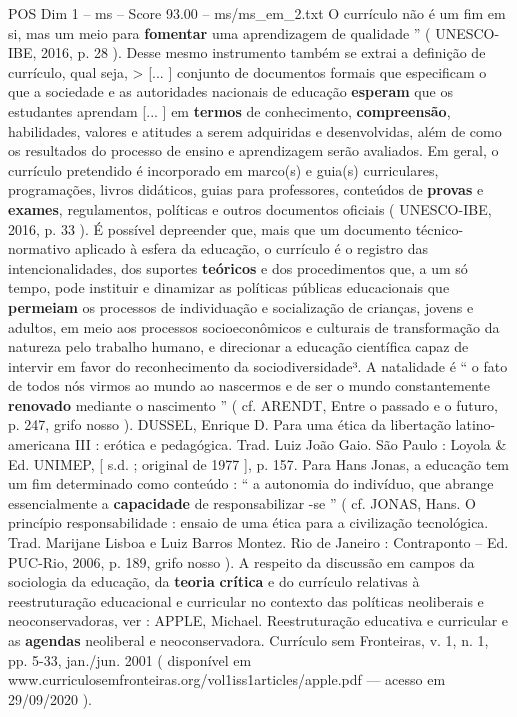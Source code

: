 \begin{textsample}{POS Dim 1 – ms – Score 93.00 – ms/ms\_em\_2.txt}
O currículo não é um fim em si, mas um meio para \textbf{fomentar} uma aprendizagem de qualidade ” ( UNESCO-IBE, 2016, p. 28 ).
Desse mesmo instrumento também se extrai a definição de currículo, qual seja, > [... ] conjunto de documentos formais que especificam o que a sociedade e as autoridades nacionais de educação \textbf{esperam} que os estudantes aprendam [... ] em \textbf{termos} de conhecimento, \textbf{compreensão}, habilidades, valores e atitudes a serem adquiridas e desenvolvidas, além de como os resultados do processo de ensino e aprendizagem serão avaliados.
Em geral, o currículo pretendido é incorporado em marco(s) e guia(s) curriculares, programações, livros didáticos, guias para professores, conteúdos de \textbf{provas} e \textbf{exames}, regulamentos, políticas e outros documentos oficiais ( UNESCO-IBE, 2016, p. 33 ).
É possível depreender que, mais que um documento técnico-normativo aplicado à esfera da educação, o currículo é o registro das intencionalidades, dos suportes \textbf{teóricos} e dos procedimentos que, a um só tempo, pode instituir e dinamizar as políticas públicas educacionais que \textbf{permeiam} os processos de individuação e socialização de crianças, jovens e adultos, em meio aos processos socioeconômicos e culturais de transformação da natureza pelo trabalho humano, e direcionar a educação científica capaz de intervir em favor do reconhecimento da sociodiversidade³.
A natalidade é “ o fato de todos nós virmos ao mundo ao nascermos e de ser o mundo constantemente \textbf{renovado} mediante o nascimento ” ( cf.
ARENDT, Entre o passado e o futuro, p. 247, grifo nosso ).
DUSSEL, Enrique D.
Para uma ética da libertação latino-americana III : erótica e pedagógica.
Trad.
Luiz João Gaio.
São Paulo : Loyola \& Ed.
UNIMEP, [ s.d. ; original de 1977 ], p. 157.
Para Hans Jonas, a educação tem um fim determinado como conteúdo : “ a autonomia do indivíduo, que abrange essencialmente a \textbf{capacidade} de responsabilizar -se ” ( cf.
JONAS, Hans.
O princípio responsabilidade : ensaio de uma ética para a civilização tecnológica.
Trad.
Marijane Lisboa e Luiz Barros Montez.
Rio de Janeiro : Contraponto – Ed.
PUC-Rio, 2006, p. 189, grifo nosso ).
A respeito da discussão em campos da sociologia da educação, da \textbf{teoria} \textbf{crítica} e do currículo relativas à reestruturação educacional e curricular no contexto das políticas neoliberais e neoconservadoras, ver : APPLE, Michael.
Reestruturação educativa e curricular e as \textbf{agendas} neoliberal e neoconservadora.
Currículo sem Fronteiras, v. 1, n. 1, pp. 5-33, jan./jun. 2001 ( disponível em www.curriculosemfronteiras.org/vol1iss1articles/apple.pdf — acesso em 29/09/2020 ).

\end{textsample}
